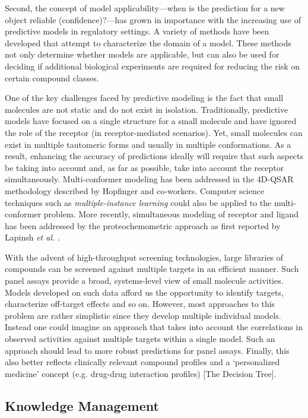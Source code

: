 \documentclass{sig-alternate}
\begin{document}
Second, the concept of model applicability---when is the prediction
for a new object reliable (confidence)?---has grown in importance with
the increasing use of predictive models in regulatory settings. A
variety of methods have been developed that attempt to characterize
the domain of a model. These methods not only determine whether models
are applicable, but can also be used for deciding if additional
biological experiments are required for reducing the risk on certain
compound classes.

One of the key challenges faced by predictive modeling is the fact
that small molecules are not static and do not exist in
isolation. Traditionally, predictive models have focused on a single
structure for a small molecule and have ignored the role of the
receptor (in receptor-mediated scenarios). Yet, small molecules can
exist in multiple tautomeric forms and usually in multiple
conformations. As a result, enhancing the accuracy of predictions
ideally will require that such aspects be taking into account and, as
far as possible, take into account the receptor
simultaneously. Multi-conformer modeling has been addressed in the
4D-QSAR methodology described by Hopfinger and co-workers.  Computer
science techniques such as \emph{multiple-instance learning} could
also be applied to the multi-conformer problem. More recently,
simultaneous modeling of receptor and ligand has been addressed by the
proteochemometric approach as first reported by Lapinsh
\textit{et al.} \cite{lapinsh2001}.

With the advent of high-throughput screening technologies, large libraries of
compounds can be screened against multiple targets in an efficient manner. Such
panel assays provide a broad, systems-level view of small molecule activities.
Models developed on such data afford us the opportunity to identify targets,
characterize off-target effects and so on. However, most approaches to this
problem are rather simplistic since they develop multiple individual models.
Instead one could imagine an approach that takes into account the correlations
in observed activities against multiple targets within a single model. Such an
approach should lead to more robust predictions for panel assays. Finally, 
this also better reflects clinically relevant compound profiles \cite{kuhn2010}
and a `personalized medicine' concept (e.g. drug-drug interaction profiles) [The
Decision Tree].

\subsection{Knowledge Management}
\label{sec:knowledge-management}
\end{document}
